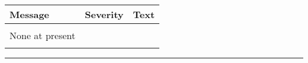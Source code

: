 \begin{messages}
{
\begin{tabular}{p{0.25\hsize} p{0.1\hsize} p{0.35\hsize}} \hline  
  \textbf{Message} & \textbf{Severity} & \textbf{Text} \\ \hline
                   &                   &   \\ %
   None at present &                   &   \\ 
                   &                   &   \\ \hline %
\end{tabular}
} 
\end{messages}

\rule{\hsize}{2mm}

\newpage

